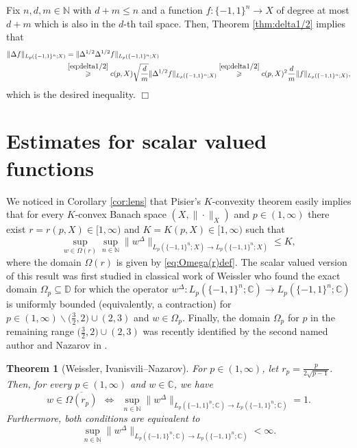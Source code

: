 \documentclass[11pt,reqno]{amsart}
\renewcommand{\leq}{\leqslant}
\renewcommand{\geq}{\geqslant}
\renewcommand{\setminus}{\smallsetminus}
\newcommand{\1}{\mathbf 1}
\newtheorem{theorem}{Theorem}
\theoremstyle{remark}
\newcommand{\C}{\mathbb C}
\newcommand{\N}{\mathbb N}
\newcommand{\mb}{\mathbb}
\begin{document}
\medskip

Fix $n,d,m\in\N$ with $d+m\leq n$ and a function $f:\{-1,1\}^n\to X$ of degree at most $d+m$ which is also in the $d$-th tail space. Then, Theorem \ref{thm:delta1/2} implies that
\begin{equation}
\begin{split}
\|\Delta f\|_{L_p(\{-1,1\}^n;X)} & = \|\Delta^{1/2}\Delta^{1/2}f\|_{L_p(\{-1,1\}^n;X)} \\ & \stackrel{\eqref{eq:delta1/2}}{\geq} c(p,X) \sqrt{\frac{d}{m}} \|\Delta^{1/2}f\|_{L_p(\{-1,1\}^n;X)} \stackrel{\eqref{eq:delta1/2}}{\geq} c(p,X)^2 \frac{d}{m} \|f\|_{L_p(\{-1,1\}^n;X)},
\end{split}
\end{equation}
which is the desired inequality.
\hfill$\Box$

\section{Estimates for scalar valued functions} \label{sec:4}

We noticed in Corollary \ref{cor:lens} that Pisier's $K$-convexity theorem easily implies that for every $K$-convex Banach space $(X,\|\cdot\|_X)$ and $p\in(1,\infty)$ there exist $r=r(p,X)\in[1,\infty)$ and $K=K(p,X)\in[1,\infty)$ such that
\begin{equation}
\sup_{w\in\Omega(r)}\sup_{n\in\mathbb{N}}\|w^{\Delta}\|_{{L_p(\{-1,1\}^n;X)}\to {L_p(\{-1,1\}^n;X)}} \leq K,
\end{equation}
where the domain $\Omega(r)$ is given by \eqref{eq:Omega(r)def}. The scalar valued version of this result was first studied in classical work of Weissler \cite{Wei79} who found the exact domain $\Omega_p\subseteq\mb{D}$ for which  the operator $w^\Delta:L_p(\{-1,1\}^n;\C)\to L_p(\{-1,1\}^n;\C)$ is uniformly bounded (equivalently, a contraction) for $p\in(1,\infty)\setminus \big(\frac{3}{2},2\big)\cup(2,3)$ and $w\in\Omega_p$. Finally, the domain $\Omega_p$ for $p$ in the remaining range $\big(\frac{3}{2},2\big)\cup(2,3)$ was recently identified by the second named author and Nazarov in \cite{IN19}.

\begin{theorem} [Weissler, Ivanisvili--Nazarov] \label{thm:weissler}
For $p\in(1,\infty)$, let $r_p=\frac{p}{2\sqrt{p-1}}$. Then, for every $p\in(1,\infty)$ and $w\in\mb{C}$, we have
\begin{equation} \label{eq:weissler}
w\in\overline{\Omega(r_p)} \ \ \Longleftrightarrow \ \  \sup_{n\in\mb{N}} \|w^{\Delta}\|_{{L_p(\{-1,1\}^n;\C)}\to {L_p(\{-1,1\}^n;\C)}}=1.
\end{equation}
Furthermore, both conditions are equivalent to
\begin{equation}
\sup_{n\in\mb{N}} \|w^{\Delta}\|_{{L_p(\{-1,1\}^n;\C)}\to {L_p(\{-1,1\}^n;\C)}} <\infty.
\end{equation}
\end{theorem}
\end{document}
